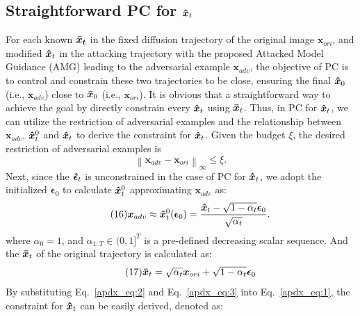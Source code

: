 \documentclass{article}
\begin{document}
\subsection{Straightforward PC for $\boldsymbol{\Hat{x}}_t$} \label{app:B1}
For each known $\boldsymbol{\Bar{x}_{t}}$ in the fixed diffusion trajectory of the original image $\boldsymbol{{x}}_{ori}$, and modified $\boldsymbol{\Hat{x}}_{t}$ in the attacking trajectory with the proposed Attacked Model Guidance (AMG) leading to the adversarial example $\boldsymbol{{x}}_{adv}$, the objective of PC is to control and constrain these two trajectories to be close, ensuring the final $\boldsymbol{\Hat{x}}_{0}$ (i.e., $\boldsymbol{{x}}_{adv}$) close to $\boldsymbol{\Bar{x}}_{0}$ (i.e., $\boldsymbol{{x}}_{ori}$). It is obvious that a straightforward way to achieve the goal by directly constrain every $\boldsymbol{\Hat{x}}_{t}$ using $\boldsymbol{\Bar{x}}_{t}$. Thus, in PC for $\boldsymbol{\Hat{x}}_{t}$,
we can utilize the restriction of adversarial examples and the relationship between $\boldsymbol{{x}}_{adv}$, $\boldsymbol{\Hat{x}}_{t}^{0}$ and $\boldsymbol{\Hat{x}}_{t}$ to derive the constraint for $\boldsymbol{\Hat{x}}_{t}$. Given the budget $\xi$, the desired restriction of adversarial examples is
\begin{equation}\tag{15}
\left\|\boldsymbol{x}_{adv}-\boldsymbol{x}_{ori}\right\|_\infty \leq \xi.
\label{apdx_eq:1}
\end{equation}
Next, since the $\boldsymbol{\Hat{\epsilon}}_{t}$ is unconstrained in the case of PC for $\boldsymbol{\Hat{x}}_{t}$, we adopt the initialized $\boldsymbol{{\epsilon}}_{0}$ to calculate  $\boldsymbol{\Hat{x}}_{t}^{0}$ approximating $\boldsymbol{x}_{adv}$ as:
\begin{equation}\tag{16}
\boldsymbol{x}_{adv} \approx \boldsymbol{\Hat{x}}_t^0(\boldsymbol{\epsilon}_{0}) = \frac{\boldsymbol{\Hat{x}}_t - \sqrt{1-\alpha_t}\boldsymbol{\epsilon}_0}{\sqrt{\alpha_t}}.
\label{apdx_eq:2}
\end{equation}
where $\alpha_0=1$, and $\alpha_{1:T}\in(0,1]^T$ is a pre-defined decreasing scalar sequence. And the $\boldsymbol{\Bar{x}}_t$ of the original trajectory is calculated as:
\begin{equation}\tag{17}
\boldsymbol{\Bar{x}}_t = \sqrt{\alpha_t}\boldsymbol{x}_{ori} + \sqrt{1-\alpha_t}\boldsymbol{\epsilon}_0
\label{apdx_eq:3}
\end{equation}
By substituting Eq.~\eqref{apdx_eq:2} and Eq.~\eqref{apdx_eq:3} into Eq.~\eqref{apdx_eq:1}, the constraint for $\boldsymbol{\Hat{x}}_t$ can be easily derived, denoted as:
\end{document}
